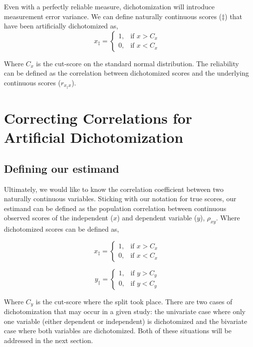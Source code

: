 \documentclass[
  letterpaper,
  DIV=11,
  numbers=noendperiod]{scrreprt}
\begin{document}
Even with a perfectly reliable measure, dichotomization will introduce
measurement error variance. We can define naturally continuous scores
(\(\ddagger\)) that have been artificially dichotomized as, \[
 x_\ddagger= 
\begin{cases}
    1,& \text{if } x>C_x\\
    0,& \text{if } x<C_x
\end{cases}
\]

Where \(C_x\) is the cut-score on the standard normal distribution. The
reliability can be defined as the correlation between dichotomized
scores and the underlying continuous scores (\(r_{x_\ddagger x}\)).

\hypertarget{correcting-correlations-for-artificial-dichotomization}{%
\section{Correcting Correlations for Artificial
Dichotomization}\label{correcting-correlations-for-artificial-dichotomization}}

\hypertarget{defining-our-estimand-3}{%
\subsection{Defining our estimand}\label{defining-our-estimand-3}}

Ultimately, we would like to know the correlation coefficient between
two naturally continuous variables. Sticking with our notation for true
scores, our estimand can be defined as the population correlation
between continuous observed scores of the independent (\(x\)) and
dependent variable (\(y\)), \(\rho_{xy}\). Where dichotomized scores can
be defined as,

\[
 x_\ddagger= 
\begin{cases}
    1,& \text{if } x>C_x\\
    0,& \text{if } x<C_x
\end{cases}
\]

\[
 y_\ddagger= 
\begin{cases}
    1,& \text{if } y>C_y\\
    0,& \text{if } y<C_y
\end{cases}
\]

Where \(C_y\) is the cut-score where the split took place. There are two
cases of dichotomization that may occur in a given study: the univariate
case where only one variable (either dependent or independent) is
dichotomized and the bivariate case where both variables are
dichotomized. Both of these situations will be addressed in the next
section.
\end{document}
